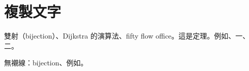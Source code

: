 \documentclass[lang=zh, text=serif]{akizumi-note}
\begin{document}
\section{複製文字}
雙射（bijection）、Dijkstra 的演算法、fifty flow office。這是定理。例如、一、二。

\textsf{無襯線：bijection、例如。}
\end{document}
